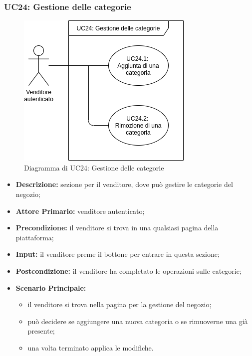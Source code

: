         \subsubsection{UC24: Gestione delle categorie}
        \label{sec:UC24}
        \begin{figure}[!ht]
            \caption{Diagramma di UC24: Gestione delle categorie}
            \vspace{10px}
            \includegraphics[scale=0.5]{../../../Images/AnalisiRequisiti/UC24}
            \centering
        \end{figure}
        \begin{itemize}
            \item \textbf{Descrizione:} sezione per il venditore, dove può gestire le categorie del negozio;
            \item \textbf{Attore Primario:} venditore autenticato;
            \item \textbf{Precondizione:} il venditore si trova in una qualsiasi pagina della piattaforma;
            \item \textbf{Input:} il venditore preme il bottone per entrare in questa sezione;
            \item \textbf{Postcondizione:} il venditore ha completato le operazioni sulle categorie;
            \item \textbf{Scenario Principale:} 
                \begin{itemize}
                    \item il venditore si trova nella pagina per la gestione del negozio;
                    \item può decidere se aggiungere una nuova categoria o se rimuoverne una già presente;
                    \item una volta terminato applica le modifiche.
                \end{itemize}
        \end{itemize}
